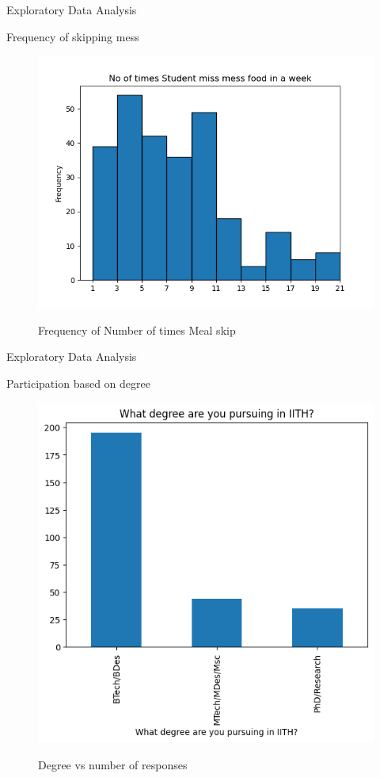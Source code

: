 \documentclass{beamer}
\begin{document}
\begin{frame}{Exploratory Data Analysis}
\begin{block}{Frequency of skipping mess}
\begin{figure}
      \centering
    \caption{Frequency of Number of times Meal skip }
    \includegraphics[scale = 0.45]{histogram_meal_skip.png}  
    \label{histogram_meal_skip}
\end{figure}
\end{block}
\end{frame}
\begin{frame}{Exploratory Data Analysis}
\begin{block}{Participation based on degree}
\begin{figure}
      \centering
    \caption{Degree vs number of responses }
    \includegraphics[scale = 0.45]{bar_degree.png}  
    \label{fig:side-by-side}
\end{figure}
\end{block}
\end{frame}
\end{document}
